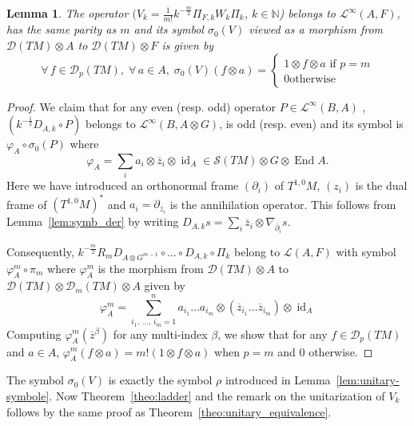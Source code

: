 \documentclass[10pt,a4paper]{article}
\newtheorem{lemm}[theo]{Lemma}
\theoremstyle{definition}
\numberwithin{equation}{section}
\newcommand{\N}{{\mathbb{N}}}
\newcommand{\be}{{\beta}}
\newcommand{\si}{{\sigma}}
\newcommand{\con}{\overline}
\newcommand{\op}{\operatorname}
\newcommand{\D}{\mathcal{D}}
\newcommand{\symb}{\mathcal{S}}
\newcommand{\lag}{\mathcal{L}}
\let\oldforall\forall
\renewcommand*{\forall}{\mathrel{\oldforall}}
\begin{document}
\begin{lemm}
The operator $(V_k = \frac{1}{m!} k^{-\frac{m}{2}} \Pi_{F,k} W_k \Pi_{k}$, $k \in \N$) belongs to $ \lag ^{\infty} (A, F)$, has the same parity as $m$ and its symbol $\si_0(V)$ viewed as a morphism from $\D(TM) \otimes A$ to $\D(TM) \otimes F$ is given by
\[
\forall \, f \in \D_p(TM), \; \forall \, a \in A, \; \si_0(V) (f \otimes a)
=
\begin{cases} 1 \otimes f \otimes a \text{ if $p = m $} \\ 0 \text{
otherwise}
\end{cases}
\]
\end{lemm}

\begin{proof}
We claim that for any even (resp. odd) operator 
$P \in \lag^{\infty} (B, A)$ , \newline $(k^{-\frac{1}{2}}D_{A,k} \circ P)$ belongs to $\lag^{\infty} (B, A
\otimes G) $, is odd (resp. even) and its symbol is $\varphi_A \circ \si_0 (P)$ where
\[
\varphi_A = \sum_ i a_i \otimes \con{z}_i \otimes
\op{id}_A \in \symb (TM) \otimes G \otimes \op{End} A.
\]
Here we have introduced an orthonormal frame $(
\partial_i)$ of $T^{1,0}M$, $(z_i)$ is the dual frame of $(T^{1,0}M)^*$ and $a_i =\partial_{\con{z}_i}$ is the annihilation operator.  This follows from Lemma~\ref{lem:symb_der} by writing $D_{A,k} s = \sum_i \con{z}_i \otimes
\nabla_{\con{\partial}_i} s$. 

Consequently, $k^{-\frac{m}{2}}R_m D_{A \otimes G^{m-1}} \circ \ldots \circ D_{A,k} \circ \Pi_k $ belong to $\lag (A, F)$ with symbol $\varphi_{A}^m \circ \pi_m$ where $\varphi_A^m $ is the morphism from $\D (TM) \otimes A$ to $\D (TM) \otimes \D_m (TM) \otimes A$ given by
\[
\varphi_A^m = \sum_{i_1, \,\ldots,\, i_m =1}^{n} a_{i_1} \ldots a_{i_m} \otimes
(\con{z}_{i_1} \ldots \con{z}_{i_m}) \otimes \op{id}_A
\]
Computing $\varphi_A^m (\con{z}^{\be})$ for any multi-index $\be$, we show that for any $f \in \D_p(TM)$ and $ a\in A$, $ \varphi_A^m (f
\otimes a) = m ! (1 \otimes f \otimes a)$ when $p=m$ and $0$ otherwise.
\end{proof}

The symbol $\sigma_0 (V)$ is exactly the symbol $\rho$ introduced in Lemma~\ref{lem:unitary-symbole}. Now Theorem~\ref{theo:ladder} and the remark on the unitarization of $V_k$ follows by the same proof as Theorem~\ref{theo:unitary_equivalence}.

\appendix
\section{} \label{sec:appendix}
\end{document}
